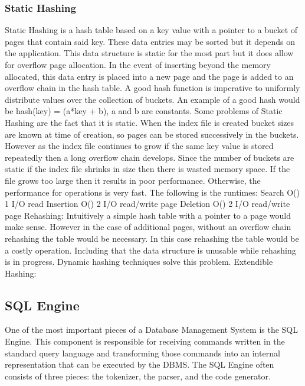\documentclass[letterpaper, 12pt]{article}
\begin{document}
\subsubsection{Static Hashing}
Static Hashing is a hash table based on a key value with a pointer to a bucket of pages that contain said key. These data entries may be sorted but it depends on the application. This data structure is static for the most part but it does allow for overflow page allocation. In the event of inserting beyond the memory allocated, this data entry is placed into a new page and the page is added to an overflow chain in the hash table.
A good hash function is imperative to uniformly distribute values over the collection of buckets. An example of a good hash would be hash(key) = (a*key + b), a and b are constants. Some problems of Static Hashing are the fact that it is static. When the index file is created bucket sizes are known at time of creation, so pages can be stored successively in the buckets. However as the index file continues to grow if the same key value is stored repeatedly then a long overflow chain develops. Since the number of buckets are static if the index file shrinks in size then there is wasted memory space. If the file grows too large then it results in poor performance. Otherwise, the performance for operations is very fast. The following is the runtimes:
Search O() 1 I/O read
Insertion O() 2 I/O read/write page
Deletion O() 2 I/O read/write page
Rehashing:
	Intuitively a simple hash table with a pointer to a page would make sense. However in the case of additional pages, without an overflow chain rehashing the table would be necessary. In this case rehashing the table would be a costly operation. Including that the data structure is unusable while rehashing is in progress. Dynamic hashing techniques solve this problem.
Extendible Hashing:

\subsection{SQL Engine}
One of the most important pieces of a Database Management System is the SQL Engine. 
This component is responsible for receiving commands written in the standard query
language and transforming those commands into an internal representation that can be
executed by the DBMS. The SQL Engine often consists of three pieces: the tokenizer, the
parser, and the code generator.
\end{document}
